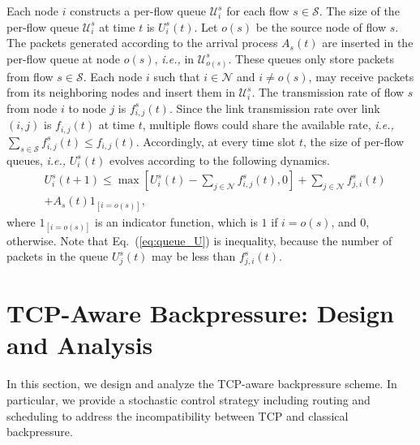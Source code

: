 \documentclass[conference]{IEEEtran}
\newcommand{\ie}{{\em i.e., }}
\newcommand{\Sset}{\mathcal{S}}
\newcommand{\Nset}{\mathcal{N}}
\newcommand{\Uset}{\mathcal{U}}
\begin{document}
Each node $i$ constructs a per-flow queue $\Uset_{i}^{s}$ for each flow $s \in \Sset$. The size of the per-flow queue $\Uset_{i}^{s}$ at time $t$ is $U_{i}^{s}(t)$.
Let $o(s)$ be the source node of flow $s$. The packets generated according to the arrival process $A_s(t)$ are inserted in the per-flow queue at node $o(s)$, \ie in $\Uset_{o(s)}^{s}$. These queues only store packets from flow $s \in \Sset$. Each node $i$ such that $i \in \Nset$ and $i \neq o(s)$, may receive packets from its neighboring nodes and insert them in $\Uset_{i}^{s}$. The transmission rate of flow $s$ from node $i$ to node $j$ is $f_{i,j}^{s}(t)$. Since the link transmission rate over link $(i,j)$ is $f_{i,j}(t)$ at time $t$, multiple flows could share the available rate, \ie $\sum_{s \in \Sset} f_{i,j}^{s}(t) \leq f_{i,j}(t)$. Accordingly, at every time slot $t$, the size of per-flow queues, \ie $U_{i}^{s}(t)$ evolves according to the following dynamics.
\begin{align} \label{eq:queue_U}
& U_{i}^{s}(t+1) \leq \max [U_{i}^{s}(t) - \sum_{j \in \Nset} f_{i,j}^{s}(t), 0] + \sum_{j \in \Nset} f_{j,i}^{s}(t) \nonumber \\
& + A_{s}(t)1_{[i=o(s)]},
\end{align} where $1_{[i=o(s)]}$ is an indicator function, which is $1$ if $i=o(s)$, and $0$, otherwise. Note that Eq.~(\ref{eq:queue_U}) is inequality, because the number of packets in the queue $U_{j}^{s}(t)$ may be less than $ f_{j,i}^{s}(t)$.









\section{TCP-Aware Backpressure: Design and Analysis}\label{sec:opt}
In this section, we design and analyze the TCP-aware backpressure scheme. In particular, we provide a stochastic control strategy including routing and scheduling to address the incompatibility between TCP and classical backpressure.
\end{document}
